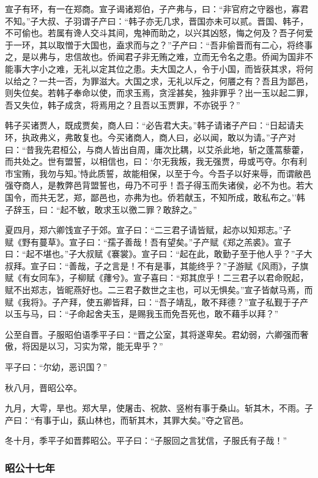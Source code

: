 \documentclass[]{article}
\begin{document}
宣子有环，有一在郑商。宣子谒诸郑伯，子产弗与，曰：``非官府之守器也，寡君不知。''子大叔、子羽谓子产曰：``韩子亦无几求，晋国亦未可以贰。晋国、韩子，不可偷也。若属有谗人交斗其间，鬼神而助之，以兴其凶怒，悔之何及？吾子何爱于一环，其以取憎于大国也，盍求而与之？''子产曰：``吾非偷晋而有二心，将终事之，是以弗与，忠信故也。侨闻君子非无贿之难，立而无令名之患。侨闻为国非不能事大字小之难，无礼以定其位之患。夫大国之人，令于小国，而皆获其求，将何以给之？一共一否，为罪滋大。大国之求，无礼以斥之，何餍之有？吾且为鄙邑，则失位矣。若韩子奉命以使，而求玉焉，贪淫甚矣，独非罪乎？出一玉以起二罪，吾又失位，韩子成贪，将焉用之？且吾以玉贾罪，不亦锐乎？''

韩子买诸贾人，既成贾矣，商人曰：``必告君大夫。''韩子请诸子产曰：``日起请夫环，执政弗义，弗敢复也。今买诸商人，商人曰，必以闻，敢以为请。''子产对曰：``昔我先君桓公，与商人皆出自周，庸次比耦，以艾杀此地，斩之蓬蒿藜藿，而共处之。世有盟誓，以相信也，曰：`尔无我叛，我无强贾，毋或丐夺。尔有利市宝贿，我勿与知。'恃此质誓，故能相保，以至于今。今吾子以好来辱，而谓敝邑强夺商人，是教弊邑背盟誓也，毋乃不可乎！吾子得玉而失诸侯，必不为也。若大国令，而共无艺，郑，鄙邑也，亦弗为也。侨若献玉，不知所成，敢私布之。''韩子辞玉，曰：``起不敏，敢求玉以徼二罪？敢辞之。''

夏四月，郑六卿饯宣子于郊。宣子曰：``二三君子请皆赋，起亦以知郑志。''子\\
赋《野有蔓草》。宣子曰：``孺子善哉！吾有望矣。''子产赋《郑之羔裘》。宣子曰：``起不堪也。''子大叔赋《褰裳》。宣子曰：``起在此，敢勤子至于他人乎？''子大叔拜。宣子曰：``善哉，子之言是！不有是事，其能终乎？''子游赋《风雨》，子旗赋《有女同车》，子柳赋《蘀兮》。宣子喜曰：``郑其庶乎！二三君子以君命贶起，赋不出郑志，皆昵燕好也。二三君子数世之主也，可以无惧矣。''宣子皆献马焉，而赋《我将》。子产拜，使五卿皆拜，曰：``吾子靖乱，敢不拜德？''宣子私觐于子产以玉与马，曰：``子命起舍夫玉，是赐我玉而免吾死也，敢不藉手以拜？''

公至自晋。子服昭伯语季平子曰：``晋之公室，其将遂卑矣。君幼弱，六卿强而奢傲，将因是以习，习实为常，能无卑乎？''

平子曰：``尔幼，恶识国？''

秋八月，晋昭公卒。

九月，大雩，旱也。郑大旱，使屠击、祝款、竖柎有事于桑山。斩其木，不雨。子产曰：``有事于山，蓺山林也，而斩其木，其罪大矣。''夺之官邑。

冬十月，季平子如晋葬昭公。平子曰：``子服回之言犹信，子服氏有子哉！''

\hypertarget{header-n2649}{%
\subsubsection{昭公十七年}\label{header-n2649}}
\end{document}
